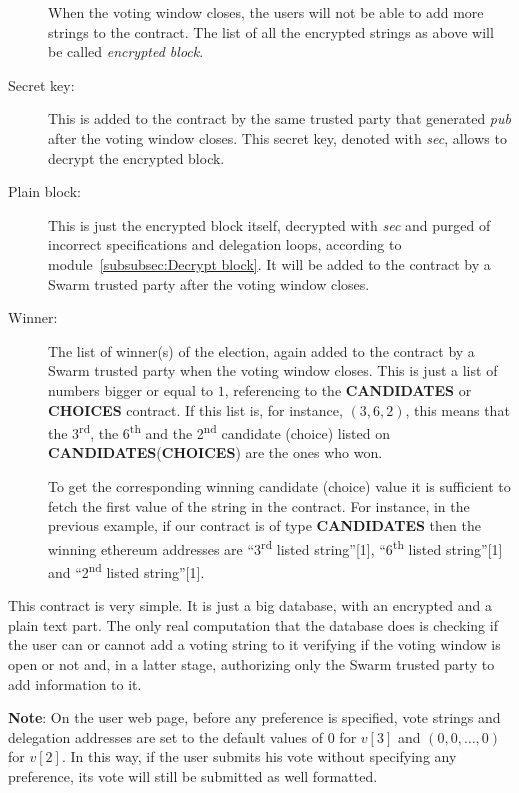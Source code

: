 \documentclass[submission, copyright,creativecommons,sharealike,noncommercial]{eptcs}
\newcommand{\Candidates}{\textbf{CANDIDATES}\xspace}
\newcommand{\Choices}{\textbf{CHOICES}\xspace}
\begin{document}
\begin{description}
		When the voting window closes, the users will not be able to add more strings to the contract. The list of all the encrypted strings as above will be called \emph{encrypted block}.
		
		\item[Secret key:] This is added to the contract by the same trusted party that generated \emph{pub} after the voting window closes. This secret key, denoted with \emph{sec}, allows to decrypt the encrypted block.
		
		\item[Plain block:] This is just the encrypted block itself, decrypted with \emph{sec} and purged of incorrect specifications and delegation loops, according to module~\ref{subsubsec:Decrypt block}. It will be added to the contract by a Swarm trusted party after the voting window closes.
			
		\item[Winner:] The list of winner(s) of the election, again added to the contract by a Swarm trusted party when the voting window closes. This is just a list of numbers bigger or equal to $1$, referencing to the \Candidates or \Choices contract. If this list is, for instance, $(3,6,2)$, this means that the 3\textsuperscript{rd}, the 6\textsuperscript{th} and the 2\textsuperscript{nd} candidate (choice) listed on \Candidates (\Choices) are the ones who won. 
		
		To get the corresponding winning candidate (choice) value it is sufficient to fetch the first value of the string in the contract. For instance, in the previous example, if our contract is of type \Candidates then the winning ethereum addresses are ``3\textsuperscript{rd} listed string''[1], ``6\textsuperscript{th} listed string''[1] and ``2\textsuperscript{nd} listed string''[1].

	\end{description}
	This contract is very simple. It is just a big database, with an encrypted and a plain text part. The only real computation that the database does is checking if the user can or cannot add a voting string to it verifying if the voting window is open or not and, in a latter stage, authorizing only the Swarm trusted party to add information to it.

	\textbf{Note}: On the user web page, before any preference is specified, vote strings and delegation addresses are set to the default values of $0$ for $v[3]$ and $(0,0, \dots, 0)$ for $v[2]$. In this way, if the user submits his vote without specifying any preference, its vote will still be submitted as well formatted.
		
\end{document}
